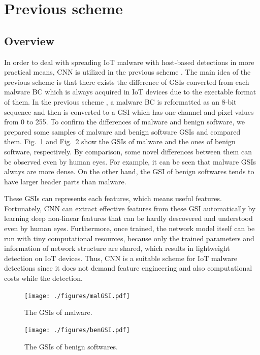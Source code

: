 \documentclass{ieeeaccess}
\newcommand{\myfigurename}{Fig.}
\begin{document}
\section{Previous scheme} \label{sec:previous_scheme}
\subsection{Overview} 
In order to deal with spreading IoT malware with host-based detections in more practical means, CNN is utilized in the previous scheme \cite{previous}.
The main idea of the previous scheme is that there exists the difference of GSIs converted from each malware BC which is always acquired in IoT devices due to the exectable format of them.
In the previous scheme \cite{previous}, a malware BC is reformatted as an 8-bit sequence and then is converted to a GSI which has one channel and pixel values from 0 to 255.
To confirm the differences of malware and benign software, we prepared some samples of malware and benign software GSIs and compared them.
\myfigurename~\ref{fig:malGSI} and \myfigurename~\ref{fig:benGSI} show the GSIs of malware and the ones of benign software, respectively.
By comparison, some novel differences between them can be observed even by human eyes.
For example, it can be seen that malware GSIs always are more dense.
On the other hand, the GSI of benign softwares tends to have larger header parts than malware.

These GSIs can represents each features, which means useful features.
Fortunately, CNN can extract effective features from these GSI automatically by learning deep non-linear features that can be hardly descovered and understood even by human eyes.
Furthermore, once trained, the network model itself can be run with tiny computational resources, because only the trained parameters and information of network structure are shared, which results in lightweight detection on IoT devices.
Thus, CNN is a suitable scheme for IoT malware detections since it does not demand feature engineering and also computational costs while the detection.

\begin{figure}[t]
 \centering
 \texttt{[image: ./figures/malGSI.pdf]}
 \caption{The GSIs of malware.} 
 \label{fig:malGSI}
\end{figure}
\begin{figure}[t]
 \centering
 \texttt{[image: ./figures/benGSI.pdf]}
 \caption{The GSIs of benign softwares.} 
 \label{fig:benGSI}
\end{figure}
\end{document}
